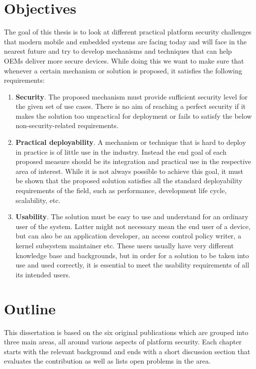 \section{Objectives}
\label{sec:Objectives}

The goal of this thesis is to look at different practical platform security challenges that modern mobile and embedded systems are facing today and will face in the nearest future and try to develop mechanisms and techniques that can help OEMs deliver more secure devices. While doing this we want to make sure that whenever a certain mechanism or solution is proposed, it satisfies the following requirements:

\begin{enumerate}
	\item \textbf{Security}. The proposed mechanism must provide sufficient security level for the given set of use cases. There is no aim of reaching a perfect security if it makes the solution too unpractical for deployment or fails to satisfy the below non-security-related requirements.      
	\item \textbf{Practical deployability}. A mechanism or technique that is hard to deploy in practice is of little use in the industry. Instead the end goal of each proposed measure should be its integration and practical use in the respective area of interest. While it is not always possible to achieve this goal, it must be shown that the proposed solution satisfies all the standard deployability requirements of the field, such as performance, development life cycle, scalability, etc.  
	\item \textbf{Usability}.	The solution must be easy to use and understand for an ordinary user of the system. Latter might not necessary mean the end user of a device, but can also be an application developer, an access control policy writer, a kernel subsystem maintainer etc. These users usually have very different knowledge base and backgrounds, but in order for a solution to be taken into use and used correctly, it is essential to meet the usability requirements of all its intended users. 
\end{enumerate}

\section{Outline}

This dissertation is based on the six original publications which are grouped into three main areas, all around various aspects of platform security. Each chapter starts with the relevant background and ends with a short discussion section that evaluates the contribution as well as lists open problems in the area. 

